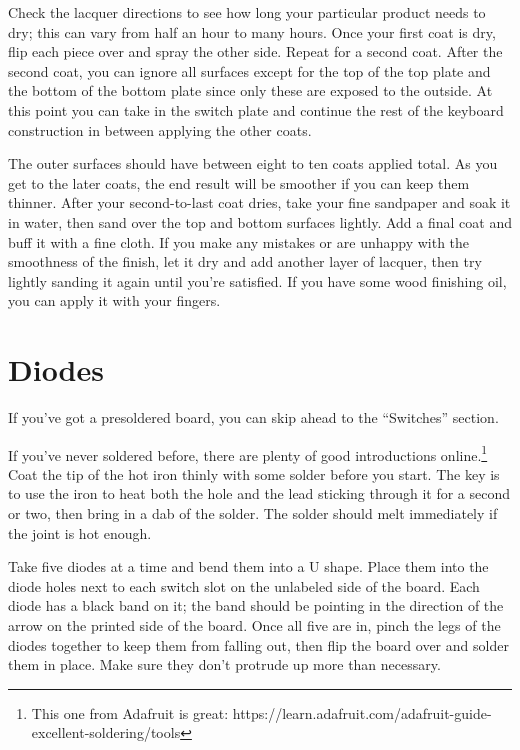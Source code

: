 \documentclass[landscape,twocolumn]{article}
\begin{document}
\vspace{1em}

Check the lacquer directions to see how long your particular product
needs to dry; this can vary from half an hour to many hours. Once your
first coat is dry, flip each piece over and spray the other
side. Repeat for a second coat. After the second coat, you can ignore
all surfaces except for the top of the top plate and the bottom of the
bottom plate since only these are exposed to the outside. At this
point you can take in the switch plate and continue the rest of the
keyboard construction in between applying the other coats.

\vspace{1em}

The outer surfaces should have between eight to ten coats applied
total. As you get to the later coats, the end result will be smoother
if you can keep them thinner. After your second-to-last coat dries,
take your fine sandpaper and soak it in water, then sand over the top
and bottom surfaces lightly. Add a final coat and buff it with a fine
cloth. If you make any mistakes or are unhappy with the smoothness of
the finish, let it dry and add another layer of lacquer, then try
lightly sanding it again until you're satisfied. If you have some wood
finishing oil, you can apply it with your fingers.

\section{Diodes}

If you've got a presoldered board, you can skip ahead to the
``Switches'' section.

\vspace {1em}

If you've never soldered before, there are plenty of good
introductions online.\footnote{This one from Adafruit is great:
  https://learn.adafruit.com/adafruit-guide-excellent-soldering/tools}
Coat the tip of the hot iron thinly with some solder before you
start. The key is to use the iron to heat both the hole and the lead
sticking through it for a second or two, then bring in a dab of the
solder. The solder should melt immediately if the joint is hot enough.

\vspace{1em}

Take five diodes at a time and bend them into a U shape. Place them
into the diode holes next to each switch slot on the unlabeled side of
the board. Each diode has a black band on it; the band should be
pointing in the direction of the arrow on the printed side of
the board. Once all five are in, pinch the legs of the diodes together
to keep them from falling out, then flip the board over and solder
them in place. Make sure they don't protrude up more than necessary.
\end{document}
